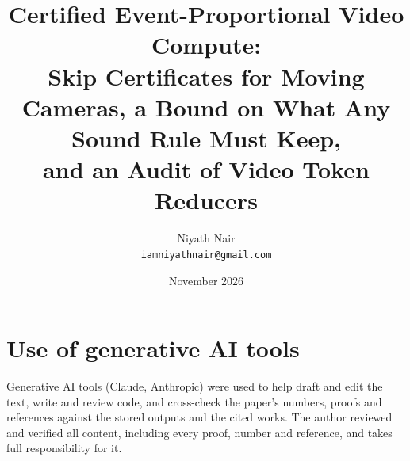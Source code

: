 \documentclass[10pt]{article}
\title{Certified Event-Proportional Video Compute:\\ Skip Certificates for Moving Cameras, a Bound on What Any Sound Rule Must Keep,\\ and an Audit of Video Token Reducers}
\author{Niyath Nair\\ \texttt{iamniyathnair@gmail.com}}
\date{November 2026}
\theoremstyle{plain}
\theoremstyle{definition}
\theoremstyle{remark}
\begin{document}
\maketitle










\section*{Use of generative AI tools}
Generative AI tools (Claude, Anthropic) were used to help draft and edit the text, write and review code, and cross-check the paper's numbers, proofs and references against the stored outputs and the cited works. The author reviewed and verified all content, including every proof, number and reference, and takes full responsibility for it.




\appendix

\end{document}
